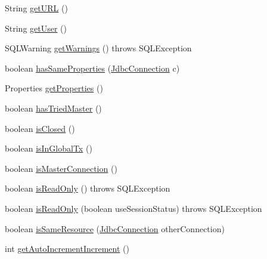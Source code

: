 \begin{DoxyCompactItemize}
\item 
String \mbox{\hyperlink{classcom_1_1mysql_1_1cj_1_1jdbc_1_1_connection_impl_a098f1e77842e56a64fad3854686fbe8a}{get\+U\+RL}} ()
\item 
String \mbox{\hyperlink{classcom_1_1mysql_1_1cj_1_1jdbc_1_1_connection_impl_afbb744e880f00dfaf434498ab5cbceba}{get\+User}} ()
\item 
S\+Q\+L\+Warning \mbox{\hyperlink{classcom_1_1mysql_1_1cj_1_1jdbc_1_1_connection_impl_a960584f75700b7d6f8418590e4474b03}{get\+Warnings}} ()  throws S\+Q\+L\+Exception 
\item 
boolean \mbox{\hyperlink{classcom_1_1mysql_1_1cj_1_1jdbc_1_1_connection_impl_a498f67a53c8188e4827e838ed9dd3356}{has\+Same\+Properties}} (\mbox{\hyperlink{interfacecom_1_1mysql_1_1cj_1_1jdbc_1_1_jdbc_connection}{Jdbc\+Connection}} c)
\item 
Properties \mbox{\hyperlink{classcom_1_1mysql_1_1cj_1_1jdbc_1_1_connection_impl_a63bb38c4e47986e5b187fb3fefb9aec6}{get\+Properties}} ()
\item 
boolean \mbox{\hyperlink{classcom_1_1mysql_1_1cj_1_1jdbc_1_1_connection_impl_acc9cbd5c4e0570757e05993e123c5696}{has\+Tried\+Master}} ()
\item 
boolean \mbox{\hyperlink{classcom_1_1mysql_1_1cj_1_1jdbc_1_1_connection_impl_a4d32ea019819ff99edce873df7e4aa35}{is\+Closed}} ()
\item 
boolean \mbox{\hyperlink{classcom_1_1mysql_1_1cj_1_1jdbc_1_1_connection_impl_a36d32f1c890a8774776f435a8d7a9f55}{is\+In\+Global\+Tx}} ()
\item 
boolean \mbox{\hyperlink{classcom_1_1mysql_1_1cj_1_1jdbc_1_1_connection_impl_a5ba146293ff6812bf52d5baf61f66e02}{is\+Master\+Connection}} ()
\item 
boolean \mbox{\hyperlink{classcom_1_1mysql_1_1cj_1_1jdbc_1_1_connection_impl_a1bd9587a13c01e6f58570c837024cf2d}{is\+Read\+Only}} ()  throws S\+Q\+L\+Exception 
\item 
boolean \mbox{\hyperlink{classcom_1_1mysql_1_1cj_1_1jdbc_1_1_connection_impl_ab81709d56fbf320b82e513a770342a90}{is\+Read\+Only}} (boolean use\+Session\+Status)  throws S\+Q\+L\+Exception 
\item 
boolean \mbox{\hyperlink{classcom_1_1mysql_1_1cj_1_1jdbc_1_1_connection_impl_a0eec8abab54aa4e2f6789b0d3db561e4}{is\+Same\+Resource}} (\mbox{\hyperlink{interfacecom_1_1mysql_1_1cj_1_1jdbc_1_1_jdbc_connection}{Jdbc\+Connection}} other\+Connection)
\item 
int \mbox{\hyperlink{classcom_1_1mysql_1_1cj_1_1jdbc_1_1_connection_impl_a47d3fb6ffbaaff0190ea15e3c35d7270}{get\+Auto\+Increment\+Increment}} ()

\end{DoxyCompactItemize}
